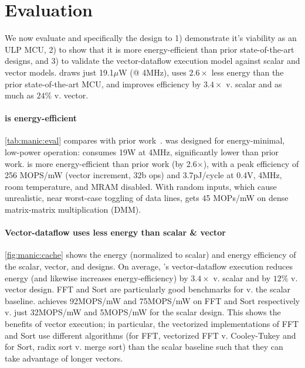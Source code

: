 \section{Evaluation}
\label{manic:eval}
We now evaluate \msilicon and specifically the \manic design to 1) demonstrate it's viability as an ULP MCU, 2) to show that it is more energy-efficient than prior state-of-the-art designs, and 3) to validate the vector-dataflow execution model against scalar and vector models.
% 
\manic draws just 19.1$\mu$W (@ 4MHz), uses $2.6\times$ less energy than the prior state-of-the-art MCU, and improves efficiency by $3.4\times$ v. scalar and as much as $24\%$ v. vector.

\tabMANICEval
\paragraph{\manic is energy-efficient}
\autoref{tab:manic:eval} compares \manic with prior work~\cite{keller2017risc,karnik2018cm,bol201919,prabhat202027}.
%
\manic was designed for energy-minimal, low-power operation: \manic consumes 19\textmu W at 4MHz, significantly lower than prior work.
%
\manic is more energy-efficient than prior work (by 2.6$\times$), with a peak efficiency of 256 MOPS/mW (vector increment, 32b ops) and 3.7pJ/cycle at 0.4V, 4MHz, room temperature, and MRAM disabled.
%
With random inputs, which cause unrealistic, near worst-case toggling of data lines, \manic gets 45 MOPs/mW on dense matrix-matrix multiplication (DMM).

\figMANICEnergyCache
\paragraph{Vector-dataflow uses less energy than scalar \& vector}
\autoref{fig:manic:cache} shows the energy (normalized to scalar) and energy efficiency of the scalar, vector, and \manic designs.
% 
On average, \manic's vector-dataflow execution reduces energy (and likewise increases energy-efficiency) by $3.4\times$ v. scalar and by $12\%$ v. vector design.
% 
FFT and Sort are particularly good benchmarks for \manic v. the scalar baseline.
% 
\manic achieves 92MOPS/mW and 75MOPS/mW on FFT and Sort respectively v. just 32MOPS/mW and 5MOPS/mW for the scalar design.
% 
This shows the benefits of vector execution; in particular, the vectorized implementations of FFT and Sort use different algorithms (for FFT, vectorized FFT v. Cooley-Tukey and for Sort, radix sort v. merge sort) than the scalar baseline such that they can take advantage of longer vectors.

